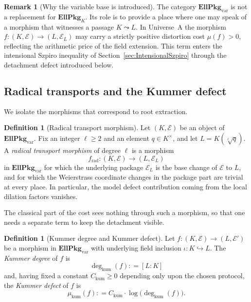 \documentclass[10pt, reqno]{amsart}
\theoremstyle{plain}
\theoremstyle{definition}
\newtheorem{definition}[theorem]{Definition}
\newtheorem{remark}[theorem]{Remark}
\theoremstyle{plain}
\newcommand{\coloneqq}{\mathrel{\mathop:}=}
\begin{document}
\begin{remark}[Why the variable base is introduced]\label{rem:WhyEllPkgVar}
The category $\mathbf{EllPkg}_{\mathrm{var}}$ is not a replacement for $\mathbf{EllPkg}_K$. Its role is to provide a place where one may speak of a morphism that witnesses a passage $K \leadsto L$. In Universe~A the morphism $f\colon (K,\mathcal{E}) \to (L,\mathcal{E}_L)$ may carry a strictly positive distortion cost $\mu(f) > 0$, reflecting the arithmetic price of the field extension. This term enters the intensional Szpiro inequality of Section~\ref{sec:IntensionalSzpiro} through the detachment defect introduced below.
\end{remark}

\subsection{Radical transports and the Kummer defect}\label{subsec:KummerDefect}

We isolate the morphisms that correspond to root extraction.

\begin{definition}[Radical transport morphism]\label{def:RadicalTransport}
Let $(K,\mathcal{E})$ be an object of $\mathbf{EllPkg}_{\mathrm{var}}$. Fix an integer $\ell\ge 2$ and an element $q\in K^\times$, and let $L = K(\sqrt[\ell]{q})$. A \emph{radical transport morphism} of degree $\ell$ is a morphism
\[
  f_{\mathrm{rad}} \colon (K,\mathcal{E}) \longrightarrow (L,\mathcal{E}_L)
\]
in $\mathbf{EllPkg}_{\mathrm{var}}$ for which the underlying package $\mathcal{E}_L$ is the base change of $\mathcal{E}$ to $L$, and for which the Weierstrass coordinate changes in the package part are trivial at every place. In particular, the model defect contribution coming from the local dilation factors vanishes.
\end{definition}

The classical part of the cost sees nothing through such a morphism, so that one needs a separate term to keep the detachment visible.

\begin{definition}[Kummer degree and Kummer defect]\label{def:KummerDefect}
Let $f \colon (K,\mathcal{E}) \to (L,\mathcal{E}')$ be a morphism in $\mathbf{EllPkg}_{\mathrm{var}}$ with underlying field inclusion $\iota \colon K \hookrightarrow L$. The \emph{Kummer degree} of $f$ is
\[
  \deg_{\mathrm{kum}}(f) \coloneqq [L:K]
\]
and, having fixed a constant $C_{\mathrm{kum}}\ge 0$ depending only upon the chosen protocol, the \emph{Kummer defect} of $f$ is
\[
  \mu_{\mathrm{kum}}(f) \coloneqq C_{\mathrm{kum}} \cdot \log\bigl(\deg_{\mathrm{kum}}(f)\bigr).
\]
\end{definition}
\end{document}
